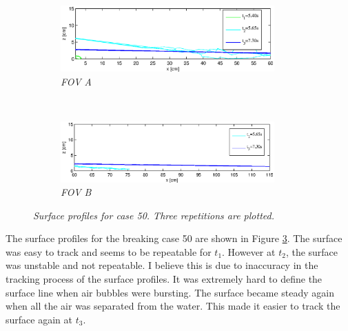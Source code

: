 \begin{figure}[]
        \centering
        \begin{subfigure}[]{0.4\textwidth}
                \includegraphics[width=0.9\textwidth]{./Figures/s_p_5A.eps}
                \caption*{\textit{FOV A}}
                \label{fig:overflate_50_1}
        \end{subfigure}
        ~ %
        \begin{subfigure}[]{0.4\textwidth}
                \includegraphics[width=0.9\textwidth]{./Figures/s_p_5B.eps}
               \caption*{\textit{FOV B}}
                \label{fig:overflate_50_2}
        \end{subfigure}
        \caption{\textit{Surface profiles for case 50. Three repetitions are plotted.}}
        \label{fig:runup_50}
\end{figure}
 The surface profiles for the breaking case 50 are shown in Figure \ref{fig:runup_50}. The surface was easy to track and seems to be repeatable for $t_1$. However at $t_2$, the surface was unstable and not repeatable. I believe this is due to inaccuracy in the tracking process of the surface profiles. It was extremely hard to define the surface line when air bubbles were bursting. The surface became steady again when all the air was separated from the water. This made it easier to track the surface again at $t_3$. 